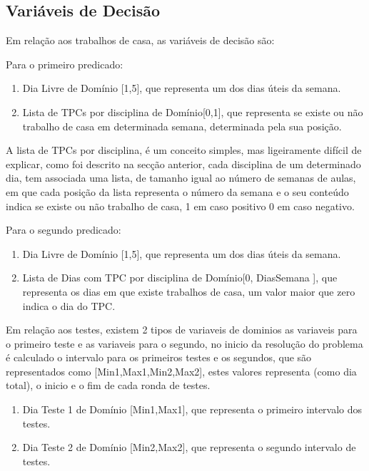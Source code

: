 \documentclass{llncs}
\begin{document}
\subsection{Variáveis de Decisão}

Em relação aos trabalhos de casa, as variáveis de decisão são:

Para o primeiro predicado:
\begin{enumerate}
\item Dia Livre de Domínio [1,5], que representa um dos dias úteis da semana.
\item Lista de TPCs por disciplina de Domínio[0,1], que representa se existe ou não trabalho de casa em determinada semana, determinada pela sua posição.
\end{enumerate}

A lista de TPCs por disciplina, é um conceito simples, mas ligeiramente difícil de explicar, como foi descrito na secção anterior, cada disciplina de um determinado dia, tem associada uma lista, de tamanho igual ao número de semanas de aulas, em que cada posição da lista representa o número da semana e o seu conteúdo indica se existe ou não trabalho de casa, 1 em caso positivo 0 em caso negativo.

Para o segundo predicado:
\begin{enumerate}
\item Dia Livre de Domínio [1,5], que representa um dos dias úteis da semana.
\item Lista de Dias com TPC por disciplina de Domínio[0, DiasSemana ], que representa os dias em que existe trabalhos de casa, um valor maior que zero indica o dia do TPC.
\end{enumerate}

%
Em relação aos testes, existem 2 tipos de variaveis de dominios as variaveis para o primeiro teste e as variaveis para o segundo, no inicio da resolução do problema é calculado o intervalo para os primeiros testes e os segundos, que são representados como [Min1,Max1,Min2,Max2], estes valores representa (como dia total), o inicio e o fim de cada ronda de testes.

\begin{enumerate}
\item Dia Teste 1 de Domínio [Min1,Max1], que representa o primeiro intervalo dos testes.
\item Dia Teste 2 de Domínio [Min2,Max2], que representa o segundo intervalo de testes.
\end{enumerate}
\end{document}
